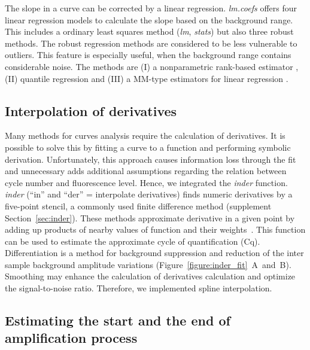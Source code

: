 \documentclass[twocolumn]{bmcart}%
\begin{document}
  The slope in a curve can be corrected by a linear regression. \textsl{lm.coefs} 
offers four linear regression models to calculate the slope based on the 
background range. This includes a ordinary least squares method (\textsl{lm}, 
\emph{stats}) but also three robust methods. The robust regression methods are 
considered to be less vulnerable to outliers. This feature is especially useful, 
when the background range contains considerable noise. The methods are (I) a 
nonparametric rank-based estimator \cite{Kloke_2012}, (II) quantile regression 
\cite{Koenker_2008} and (III) a MM-type estimators for linear regression 
\cite{Todorov_2009}. 

\subsection*{Interpolation of derivatives}
  Many methods for curves analysis require the calculation of derivatives. It is 
possible to solve this by fitting a curve to a function and performing symbolic 
derivation. Unfortunately, this approach causes information loss through the fit 
and unnecessary adds additional assumptions regarding the relation between cycle 
number and fluorescence level. Hence, we integrated the \textsl{inder} function. 
\textsl{inder} (``in'' and ``der'' = interpolate derivatives) finds numeric 
derivatives by a five-point stencil, a commonly used finite difference method 
(supplement Section~\ref{sec:inder}). These methods approximate derivative in a 
given point by adding up products of nearby values of function and their 
weights~\cite{Dahlquist_2008}. This function can be used to estimate the 
approximate cycle of quantification (Cq). Differentiation is a method for 
background suppression and reduction of the inter sample background amplitude 
variations (Figure~\ref{figure:inder_fit}~A~and~B). Smoothing may enhance the 
calculation of derivatives calculation and optimize the signal-to-noise ratio. 
Therefore, we implemented spline interpolation.

\subsection*{Estimating the start and the end of amplification process}
\end{document}
